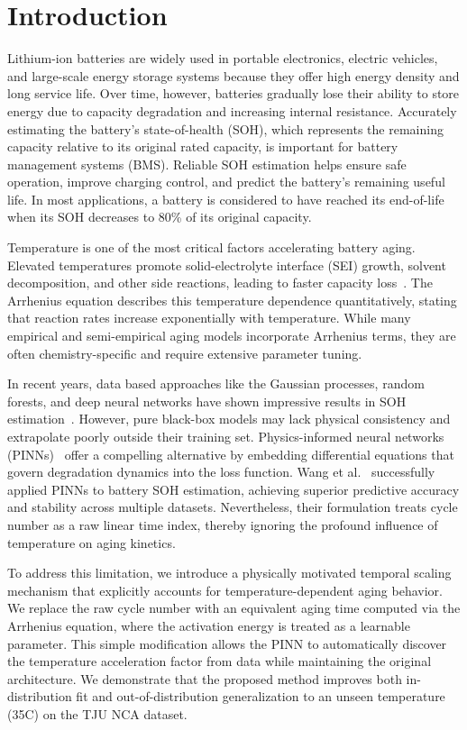 \documentclass[conference]{IEEEtran}
\begin{document}
\section{Introduction}
Lithium-ion batteries are widely used in portable electronics, electric vehicles, and large-scale energy storage systems because they offer high energy density and long service life. Over time, however, batteries gradually lose their ability to store energy due to capacity degradation and increasing internal resistance. Accurately estimating the battery's state-of-health (SOH), which represents the remaining capacity relative to its original rated capacity, is important for battery management systems (BMS). Reliable SOH estimation helps ensure safe operation, improve charging control, and predict the battery's remaining useful life. In most applications, a battery is considered to have reached its end-of-life when its SOH decreases to 80\% of its original capacity.

Temperature is one of the most critical factors accelerating battery aging. Elevated temperatures promote solid-electrolyte interface (SEI) growth, solvent decomposition, and other side reactions, leading to faster capacity loss~\cite{spotnitz2003,bloom2005}. The Arrhenius equation describes this temperature dependence quantitatively, stating that reaction rates increase exponentially with temperature. While many empirical and semi-empirical aging models incorporate Arrhenius terms, they are often chemistry-specific and require extensive parameter tuning.

In recent years, data based approaches like the Gaussian processes, random forests, and deep neural networks have shown impressive results in SOH estimation~\cite{severson2019}. However, pure black-box models may lack physical consistency and extrapolate poorly outside their training set. Physics-informed neural networks (PINNs)~\cite{raissi2019physics} offer a compelling alternative by embedding differential equations that govern degradation dynamics into the loss function. Wang et al.~\cite{wang2024physics} successfully applied PINNs to battery SOH estimation, achieving superior predictive accuracy and stability across multiple datasets. Nevertheless, their formulation treats cycle number as a raw linear time index, thereby ignoring the profound influence of temperature on aging kinetics.

To address this limitation, we introduce a physically motivated temporal scaling mechanism that explicitly accounts for temperature-dependent aging behavior. We replace the raw cycle number with an equivalent aging time computed via the Arrhenius equation, where the activation energy is treated as a learnable parameter. This simple modification allows the PINN to automatically discover the temperature acceleration factor from data while maintaining the original architecture. We demonstrate that the proposed method improves both in-distribution fit and out-of-distribution generalization to an unseen temperature (35\textdegree C) on the TJU NCA dataset.
\end{document}
